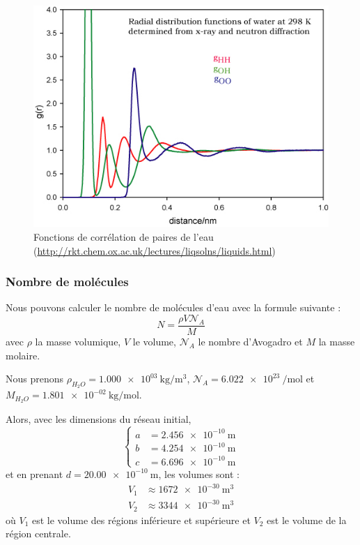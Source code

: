 \documentclass[11pt, a4paper]{article}
\begin{document}
\begin{figure}[hptb]
	\centering
	\includegraphics[width=\linewidth]{RDF_eau.jpg}
	\caption{Fonctions de corrélation de paires de l'eau (\url{http://rkt.chem.ox.ac.uk/lectures/liqsolns/liquids.html})}
	\label{fig:RDF_eau}
\end{figure}

		\subsubsection{Nombre de molécules}

Nous pouvons calculer le nombre de molécules d'eau avec la formule suivante :
	\[ N = \frac{\rho V \mathcal{N}_A}{M} \]
avec $\rho$ la masse volumique, $V$ le volume, $\mathcal{N}_A$ le nombre d'Avogadro et $M$ la masse molaire.

Nous prenons $\rho_{H_2O} = \qty{1.000e+03}{\kg \per \cubic\m}$, $\mathcal{N}_A = \qty{6.022e+23}{\per \mol}$ et $M_{H_2O} = \qty{1.801e-02}{\kg \per \mol}$.

Alors, avec les dimensions du réseau initial,
\begin{equation*}
	\left\lbrace
	\begin{aligned}
		a &= \qty{2.456e-10}{\m}\\
		b &= \qty{4.254e-10}{\m}\\
		c &= \qty{6.696e-10}{\m}
	\end{aligned}
	\right.
\end{equation*}
et en prenant $d = \qty{20.00e-10}{\m}$, les volumes sont :
\begin{align*}
	V_1 &\approx \qty{1672e-30}{\cubic \m}\\
	V_2 &\approx \qty{3344e-30}{\cubic \m}
\end{align*}
où $V_1$ est le volume des régions inférieure et supérieure et $V_2$ est le volume de la région centrale.
\end{document}
